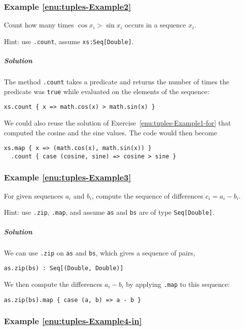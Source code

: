 \subsubsection{Example \label{enu:tuples-Example2}\ref{enu:tuples-Example2}}

Count how many times $\cos x_{i}>\sin x_{i}$ occurs in a sequence
$x_{i}$.

Hint: use \lstinline!.count!, assume \lstinline!xs:Seq[Double]!.

\subparagraph{Solution }

The method \lstinline!.count! takes a predicate and returns the number
of times the predicate was \lstinline!true! while evaluated on the
elements of the sequence:
\begin{lstlisting}
xs.count { x => math.cos(x) > math.sin(x) }
\end{lstlisting}
We could also reuse the solution of Exercise~\ref{enu:tuples-Example1-for}
that computed the cosine and the sine values. The code would then
become
\begin{lstlisting}
xs.map { x => (math.cos(x), math.sin(x)) }
  .count { case (cosine, sine) => cosine > sine }
\end{lstlisting}


\subsubsection{Example \label{enu:tuples-Example3}\ref{enu:tuples-Example3}}

For given sequences $a_{i}$ and $b_{i}$, compute the sequence of
differences $c_{i}=a_{i}-b_{i}$.

Hint: use \lstinline!.zip!, \lstinline!.map!, and assume \lstinline!as!
and \lstinline!bs! are of type \lstinline!Seq[Double]!.

\subparagraph{Solution }

We can use \lstinline!.zip! on \lstinline!as! and \lstinline!bs!,
which gives a sequence of pairs,
\begin{lstlisting}
as.zip(bs) : Seq[(Double, Double)]
\end{lstlisting}
We then compute the differences $a_{i}-b_{i}$ by applying \lstinline!.map!
to this sequence:
\begin{lstlisting}
as.zip(bs).map { case (a, b) => a - b }
\end{lstlisting}


\subsubsection{Example \label{enu:tuples-Example4-in}\ref{enu:tuples-Example4-in}}

